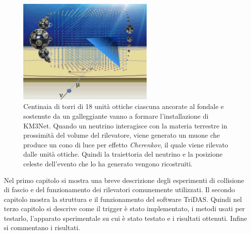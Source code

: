 \documentclass[../main.tex]{subfiles}
\begin{document}
\begin{figure}[!t]
    \centering
    \includegraphics[width=0.6\textwidth]{KM3NetTowers.png}
    \caption{\small Centinaia di torri di 18 unità ottiche ciascuna ancorate al fondale e sostenute da un galleggiante vanno a formare l'installazione di KM3Net. Quando un neutrino interagisce con la materia terrestre in prossimità del volume del rilevatore, viene generato un muone che produce un cono di luce per effetto \textit{Cherenkov}, il quale viene rilevato dalle unità ottiche. Quindi la traiettoria del neutrino e la posizione celeste dell'evento che lo ha generato vengono ricostruiti.
    \cite{km3}}
    \label{fig:towers}
\end{figure}

Nel primo capitolo si mostra una breve descrizione degli esperimenti di collisione di fascio e del funzionamento dei rilevatori comunemente utilizzati.
Il secondo capitolo mostra la struttura e il funzionamento del software TriDAS.
Quindi nel terzo capitolo si descrive come il trigger è stato implementato, i metodi usati per testarlo, l'apparato sperimentale su cui è stato testato e i risultati ottenuti.
Infine si commentano i risultati.
\end{document}
